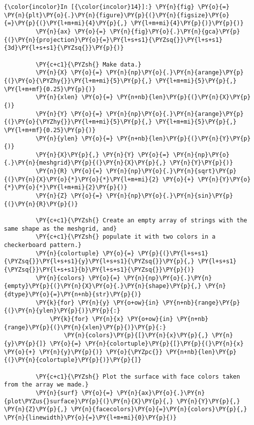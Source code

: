     \begin{Verbatim}[commandchars=\\\{\}]
{\color{incolor}In [{\color{incolor}14}]:} \PY{n}{fig} \PY{o}{=} \PY{n}{plt}\PY{o}{.}\PY{n}{figure}\PY{p}{(}\PY{n}{figsize}\PY{o}{=}\PY{p}{(}\PY{l+m+mi}{4}\PY{p}{,} \PY{l+m+mi}{4}\PY{p}{)}\PY{p}{)}
         \PY{n}{ax} \PY{o}{=} \PY{n}{fig}\PY{o}{.}\PY{n}{gca}\PY{p}{(}\PY{n}{projection}\PY{o}{=}\PY{l+s+s1}{\PYZsq{}}\PY{l+s+s1}{3d}\PY{l+s+s1}{\PYZsq{}}\PY{p}{)}
         
         \PY{c+c1}{\PYZsh{} Make data.}
         \PY{n}{X} \PY{o}{=} \PY{n}{np}\PY{o}{.}\PY{n}{arange}\PY{p}{(}\PY{o}{\PYZhy{}}\PY{l+m+mi}{5}\PY{p}{,} \PY{l+m+mi}{5}\PY{p}{,} \PY{l+m+mf}{0.25}\PY{p}{)}
         \PY{n}{xlen} \PY{o}{=} \PY{n+nb}{len}\PY{p}{(}\PY{n}{X}\PY{p}{)}
         \PY{n}{Y} \PY{o}{=} \PY{n}{np}\PY{o}{.}\PY{n}{arange}\PY{p}{(}\PY{o}{\PYZhy{}}\PY{l+m+mi}{5}\PY{p}{,} \PY{l+m+mi}{5}\PY{p}{,} \PY{l+m+mf}{0.25}\PY{p}{)}
         \PY{n}{ylen} \PY{o}{=} \PY{n+nb}{len}\PY{p}{(}\PY{n}{Y}\PY{p}{)}
         \PY{n}{X}\PY{p}{,} \PY{n}{Y} \PY{o}{=} \PY{n}{np}\PY{o}{.}\PY{n}{meshgrid}\PY{p}{(}\PY{n}{X}\PY{p}{,} \PY{n}{Y}\PY{p}{)}
         \PY{n}{R} \PY{o}{=} \PY{n}{np}\PY{o}{.}\PY{n}{sqrt}\PY{p}{(}\PY{n}{X}\PY{o}{*}\PY{o}{*}\PY{l+m+mi}{2} \PY{o}{+} \PY{n}{Y}\PY{o}{*}\PY{o}{*}\PY{l+m+mi}{2}\PY{p}{)}
         \PY{n}{Z} \PY{o}{=} \PY{n}{np}\PY{o}{.}\PY{n}{sin}\PY{p}{(}\PY{n}{R}\PY{p}{)}
         
         \PY{c+c1}{\PYZsh{} Create an empty array of strings with the same shape as the meshgrid, and}
         \PY{c+c1}{\PYZsh{} populate it with two colors in a checkerboard pattern.}
         \PY{n}{colortuple} \PY{o}{=} \PY{p}{(}\PY{l+s+s1}{\PYZsq{}}\PY{l+s+s1}{y}\PY{l+s+s1}{\PYZsq{}}\PY{p}{,} \PY{l+s+s1}{\PYZsq{}}\PY{l+s+s1}{b}\PY{l+s+s1}{\PYZsq{}}\PY{p}{)}
         \PY{n}{colors} \PY{o}{=} \PY{n}{np}\PY{o}{.}\PY{n}{empty}\PY{p}{(}\PY{n}{X}\PY{o}{.}\PY{n}{shape}\PY{p}{,} \PY{n}{dtype}\PY{o}{=}\PY{n+nb}{str}\PY{p}{)}
         \PY{k}{for} \PY{n}{y} \PY{o+ow}{in} \PY{n+nb}{range}\PY{p}{(}\PY{n}{ylen}\PY{p}{)}\PY{p}{:}
             \PY{k}{for} \PY{n}{x} \PY{o+ow}{in} \PY{n+nb}{range}\PY{p}{(}\PY{n}{xlen}\PY{p}{)}\PY{p}{:}
                 \PY{n}{colors}\PY{p}{[}\PY{n}{x}\PY{p}{,} \PY{n}{y}\PY{p}{]} \PY{o}{=} \PY{n}{colortuple}\PY{p}{[}\PY{p}{(}\PY{n}{x} \PY{o}{+} \PY{n}{y}\PY{p}{)} \PY{o}{\PYZpc{}} \PY{n+nb}{len}\PY{p}{(}\PY{n}{colortuple}\PY{p}{)}\PY{p}{]}
         
         \PY{c+c1}{\PYZsh{} Plot the surface with face colors taken from the array we made.}
         \PY{n}{surf} \PY{o}{=} \PY{n}{ax}\PY{o}{.}\PY{n}{plot\PYZus{}surface}\PY{p}{(}\PY{n}{X}\PY{p}{,} \PY{n}{Y}\PY{p}{,} \PY{n}{Z}\PY{p}{,} \PY{n}{facecolors}\PY{o}{=}\PY{n}{colors}\PY{p}{,} \PY{n}{linewidth}\PY{o}{=}\PY{l+m+mi}{0}\PY{p}{)}
         

\end{Verbatim}
